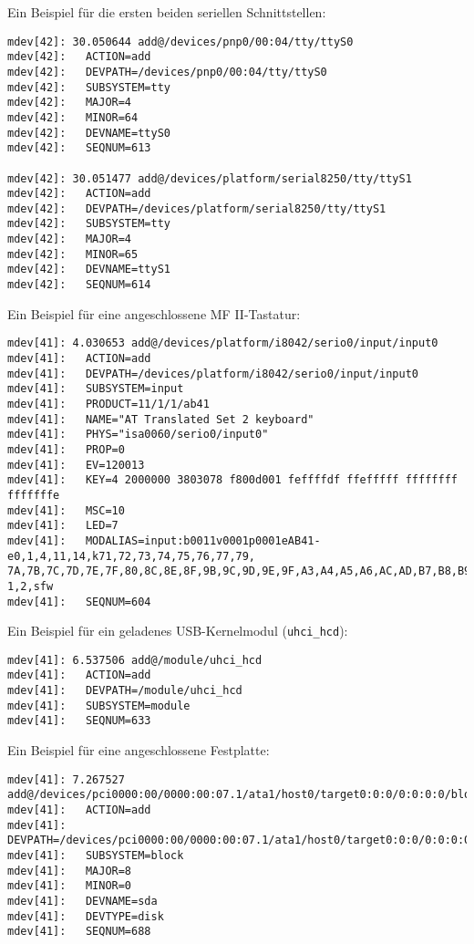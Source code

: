 Ein Beispiel für die ersten beiden seriellen Schnittstellen:

\begin{scriptsize}
\begin{verbatim}
mdev[42]: 30.050644 add@/devices/pnp0/00:04/tty/ttyS0
mdev[42]:   ACTION=add
mdev[42]:   DEVPATH=/devices/pnp0/00:04/tty/ttyS0
mdev[42]:   SUBSYSTEM=tty
mdev[42]:   MAJOR=4
mdev[42]:   MINOR=64
mdev[42]:   DEVNAME=ttyS0
mdev[42]:   SEQNUM=613

mdev[42]: 30.051477 add@/devices/platform/serial8250/tty/ttyS1
mdev[42]:   ACTION=add
mdev[42]:   DEVPATH=/devices/platform/serial8250/tty/ttyS1
mdev[42]:   SUBSYSTEM=tty
mdev[42]:   MAJOR=4
mdev[42]:   MINOR=65
mdev[42]:   DEVNAME=ttyS1
mdev[42]:   SEQNUM=614
\end{verbatim}
\end{scriptsize}

Ein Beispiel für eine angeschlossene MF II-Tastatur:

\begin{scriptsize}
\begin{verbatim}
mdev[41]: 4.030653 add@/devices/platform/i8042/serio0/input/input0
mdev[41]:   ACTION=add
mdev[41]:   DEVPATH=/devices/platform/i8042/serio0/input/input0
mdev[41]:   SUBSYSTEM=input
mdev[41]:   PRODUCT=11/1/1/ab41
mdev[41]:   NAME="AT Translated Set 2 keyboard"
mdev[41]:   PHYS="isa0060/serio0/input0"
mdev[41]:   PROP=0
mdev[41]:   EV=120013
mdev[41]:   KEY=4 2000000 3803078 f800d001 feffffdf ffefffff ffffffff fffffffe
mdev[41]:   MSC=10
mdev[41]:   LED=7
mdev[41]:   MODALIAS=input:b0011v0001p0001eAB41-e0,1,4,11,14,k71,72,73,74,75,76,77,79,
7A,7B,7C,7D,7E,7F,80,8C,8E,8F,9B,9C,9D,9E,9F,A3,A4,A5,A6,AC,AD,B7,B8,B9,D9,E2,ram4,l0,
1,2,sfw
mdev[41]:   SEQNUM=604
\end{verbatim}
\end{scriptsize}

Ein Beispiel für ein geladenes USB-Kernelmodul (\texttt{uhci\_hcd}):

\begin{scriptsize}
\begin{verbatim}
mdev[41]: 6.537506 add@/module/uhci_hcd
mdev[41]:   ACTION=add
mdev[41]:   DEVPATH=/module/uhci_hcd
mdev[41]:   SUBSYSTEM=module
mdev[41]:   SEQNUM=633
\end{verbatim}
\end{scriptsize}

Ein Beispiel für eine angeschlossene Festplatte:

\begin{scriptsize}
\begin{verbatim}
mdev[41]: 7.267527 add@/devices/pci0000:00/0000:00:07.1/ata1/host0/target0:0:0/0:0:0:0/block/sda
mdev[41]:   ACTION=add
mdev[41]:   DEVPATH=/devices/pci0000:00/0000:00:07.1/ata1/host0/target0:0:0/0:0:0:0/block/sda
mdev[41]:   SUBSYSTEM=block
mdev[41]:   MAJOR=8
mdev[41]:   MINOR=0
mdev[41]:   DEVNAME=sda
mdev[41]:   DEVTYPE=disk
mdev[41]:   SEQNUM=688
\end{verbatim}
\end{scriptsize}

